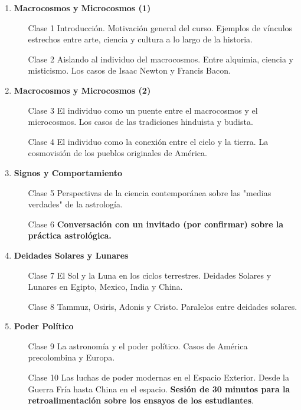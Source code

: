 \documentclass[12pt]{report}
\begin{document}
\begin{enumerate}
\item {\bf Macrocosmos y Microcosmos (1)}
\begin{itemize}
\item[Clase 1] Introducci\'on. Motivaci\'on general del
  curso. Ejemplos de v\'inculos estrechos entre arte, ciencia y cultura a lo
  largo de la historia. 
\item[Clase 2] Aislando al individuo del macrocosmos. Entre alquimia, ciencia y
  misticismo. Los casos de Isaac Newton y Francis Bacon.  
\end{itemize}

\item {\bf Macrocosmos y Microcosmos (2)}
\begin{itemize}
\item[Clase 3] El individuo como un puente entre el macrocosmos y el
  microcosmos. Los casos de las tradiciones hinduista y budista.
\item[Clase 4] El individuo como la conexi\'on entre el cielo y la
  tierra. La cosmovisi\'on de los pueblos originales de Am\'erica.
\end{itemize}

\item {\bf Signos y Comportamiento}
\begin{itemize}
\item[Clase 5] Perspectivas de la ciencia contempor\'anea sobre las
  "medias verdades" de la astrolog\'ia.
\item[Clase 6] {\bf Conversaci\'on con un invitado (por confirmar) sobre
  la pr\'actica astrol\'ogica.} 
\end{itemize}


\item {\bf Deidades Solares y Lunares}
  \begin{itemize}
  \item[Clase 7] El Sol y la Luna en los ciclos terrestres. Deidades
    Solares y Lunares en Egipto, Mexico, India y China.
  \item[Clase 8] Tammuz, Osiris, Adonis y Cristo. Paralelos entre
    deidades solares.
\end{itemize}

\item {\bf Poder Pol\'itico}
\begin{itemize}
\item[Clase 9] La astronom\'ia y el poder pol\'itico.
Casos de Am\'erica precolombina y Europa.
\item[Clase 10] Las luchas de poder modernas en el Espacio
  Exterior. Desde la Guerra Fr\'ia hasta China en el espacio. 
  {\bf Sesi\'on de 30 minutos para la retroalimentaci\'on sobre los
    ensayos de los estudiantes}. 
\end{itemize}


\end{enumerate}
\end{document}
